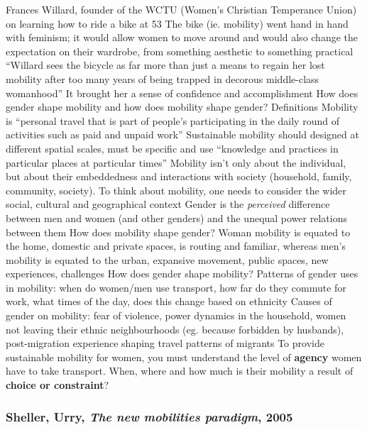 \documentclass{article}
\begin{document}
\begin{outline}
	\1 Frances Willard, founder of the WCTU (Women's Christian Temperance Union) on learning how to ride a bike at 53
		\2 The bike (ie. mobility) went hand in hand with feminism; it would allow women to move around and would also change the expectation on their wardrobe, from something aesthetic to something practical
		 \2 ``Willard sees the bicycle as far more than just a means to regain her lost mobility after too many years of being trapped in decorous middle-class womanhood''
		\2 It brought her a sense of confidence and accomplishment
	\1 How does gender shape mobility and how does mobility shape gender?
	\1 Definitions
		\2 Mobility is ``personal travel that is part of people's participating in the daily round of activities such as paid and unpaid work''
		\2 Sustainable mobility should designed at different spatial scales, must be specific and use ``knowledge and practices in particular places at particular times''
		\2 Mobility isn't only about the individual, but about their embeddedness and interactions with society (household, family, community, society).  To think about mobility, one needs to consider the wider social, cultural and geographical context
		\2 Gender is the \textit{perceived} difference between men and women (and other genders) and the unequal power relations between them
	\1 How does mobility shape gender?
		\2 Woman mobility is equated to the home, domestic and private spaces, is routing and familiar, whereas men's mobility is equated to the urban, expansive movement, public spaces, new experiences, challenges
	\1 How does gender shape mobility?
		\2 Patterns of gender uses in mobility: when do women/men use transport, how far do they commute for work, what times of the day, does this change based on ethnicity
		\2 Causes of gender on mobility: fear of violence, power dynamics in the household, women not leaving their ethnic neighbourhoods (eg. because forbidden by husbands), post-migration experience shaping travel patterns of migrants
	\1 To provide sustainable mobility for women, you must understand the level of \textbf{agency} women have to take transport. When, where and how much is their mobility a result of \textbf{choice or constraint}?
\end{outline}

\subsubsection{Sheller, Urry, \textit{The new mobilities paradigm}, 2005}
\end{document}
